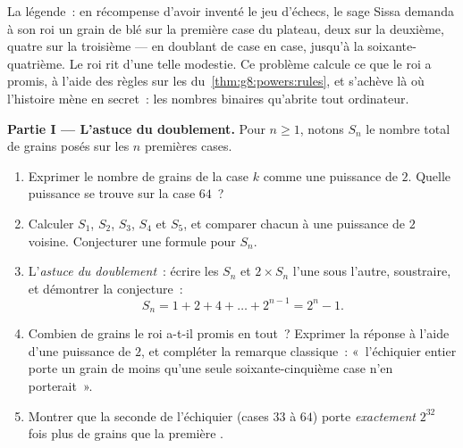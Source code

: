 \begin{problem}[{Devoir maison --- la \omterm{def:g1:addition:def}{somme} géométrique
$1 + 2 + 4 + \dots + 2^{n-1} = 2^n - 1$, d'une légende célèbre
jusqu'aux nombres binaires}]
\label{pb:g8:powers:1}
La légende~: en récompense d'avoir inventé le jeu d'échecs, le sage
Sissa demanda à son roi un grain de blé sur la première case du
plateau, deux sur la deuxième, quatre sur la troisième --- en
doublant de case en case, jusqu'à la soixante-quatrième. Le roi rit
d'une telle modestie. Ce problème calcule ce que le roi a promis, à
l'aide des règles sur les  du~\cref{thm:g8:powers:rules}, et
s'achève là où l'histoire mène en secret~: les nombres binaires
qu'abrite tout ordinateur.

\medskip
\noindent\textbf{Partie I --- L'astuce du doublement.}
Pour $n \geq 1$, notons $S_n$ le nombre total de grains posés sur les
$n$ premières cases.
\begin{enumerate}
  \item Exprimer le nombre de grains de la case $k$ comme une
        puissance de $2$. Quelle puissance se trouve sur la case
        $64$~?
  \item Calculer $S_1$, $S_2$, $S_3$, $S_4$ et $S_5$, et comparer
        chacun à une puissance de $2$ voisine. Conjecturer une
        formule pour $S_n$.
  \item L'\emph{astuce du doublement}~: écrire les  $S_n$ et
        $2 \times S_n$ l'une sous l'autre, soustraire, et démontrer
        la conjecture~:
        \[
        S_n = 1 + 2 + 4 + \dots + 2^{n-1} = 2^n - 1 .
        \]
  \item Combien de grains le roi a-t-il promis en tout~? Exprimer la
        réponse à l'aide d'une puissance de $2$, et compléter la
        remarque classique~: «~l'échiquier entier porte un grain de
        moins qu'une seule soixante-cinquième case n'en porterait~».
  \item Montrer que la seconde  de l'échiquier (cases $33$ à
        $64$) porte \emph{exactement} $2^{32}$ fois plus de grains
        que la première .
\end{enumerate}


\end{problem}
